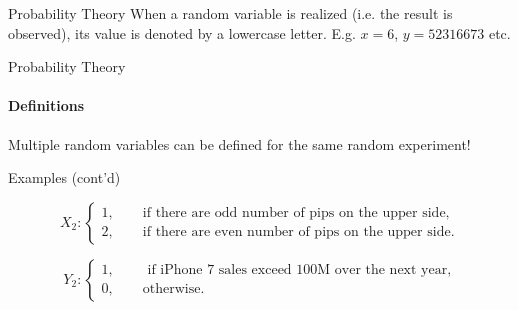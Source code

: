 \documentclass{beamer}\usepackage[]{graphicx}\usepackage[]{color}
\begin{document}
\begin{darkframes}
\begin{frame}[label=lists]{Probability Theory}
	When a random variable is realized (i.e. the result is observed), its value is denoted by a lowercase letter. E.g. $x=6$, $y=52316673$ etc. 	
				
    \end{frame}
    
    
	\begin{frame}[label=lists]{Probability Theory}
		\framesubtitle{Definitions}    
		Multiple random variables can be defined for the same random experiment!		
      	
      	
      	\begin{exampleblock}{Examples (cont'd)}
      		
        		$$ X_2 : \begin{cases}
        					1, \qquad \text{if there are odd number of pips on the upper side,}  \\
        					2, \qquad \text{if there are even number of pips on the upper side.}  
        		            \end{cases}
        		      $$ 
        		
        		$$ Y_2 : \begin{cases}
        					1, \qquad \text{ if iPhone 7 sales exceed 100M over the next year,}  \\
        					0, \qquad \text{otherwise.}  
        		            \end{cases}
        		      $$      
        		            
        	
        \end{exampleblock}		
		
		
    \end{frame}    
    
    
    

      	


\end{darkframes}
\end{document}
